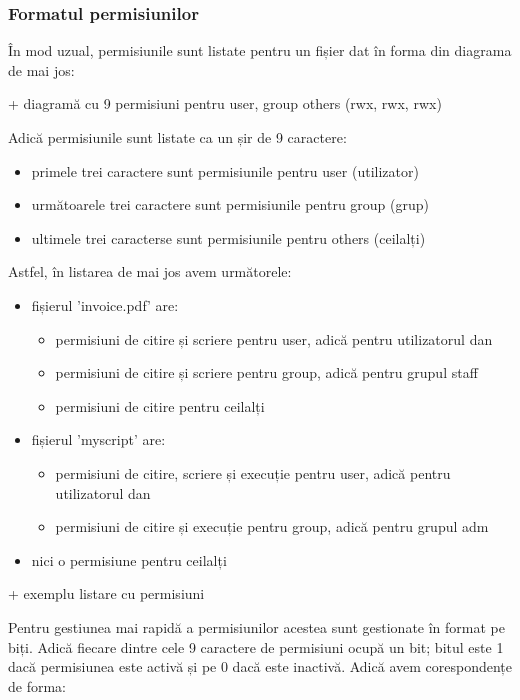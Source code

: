 \subsubsection{Formatul permisiunilor}
\label{sec:users-fs-perms-format}

În mod uzual, permisiunile sunt listate pentru un fișier dat în forma din
diagrama de mai jos:

+ diagramă cu 9 permisiuni pentru user, group others (rwx, rwx, rwx)

Adică permisiunile sunt listate ca un șir de 9 caractere:

\begin{itemize}
	\item primele trei caractere sunt permisiunile pentru user (utilizator)
	\item următoarele trei caractere sunt permisiunile pentru group (grup)
	\item ultimele trei caracterse sunt permisiunile pentru others (ceilalți)
\end{itemize}

Astfel, în listarea de mai jos avem următorele:

\begin{itemize}
	\item fișierul 'invoice.pdf' are:
	\begin{itemize}
		\item permisiuni de citire și scriere pentru user, adică pentru
			utilizatorul dan
		\item permisiuni de citire și scriere pentru group, adică pentru
			grupul staff
		\item permisiuni de citire pentru ceilalți
	\end{itemize}
	\item fișierul 'myscript' are:
	\begin{itemize}
		\item permisiuni de citire, scriere și execuție pentru user,
			adică pentru utilizatorul dan
		\item permisiuni de citire și execuție pentru group, adică
			pentru grupul adm
	\end{itemize}
	\item nici o permisiune pentru ceilalți
\end{itemize}

+ exemplu listare cu permisiuni

Pentru gestiunea mai rapidă a permisiunilor acestea sunt gestionate în format pe
biți. Adică fiecare dintre cele 9 caractere de permisiuni ocupă un bit; bitul
este 1 dacă permisiunea este activă și pe 0 dacă este inactivă. Adică avem
corespondențe de forma:

